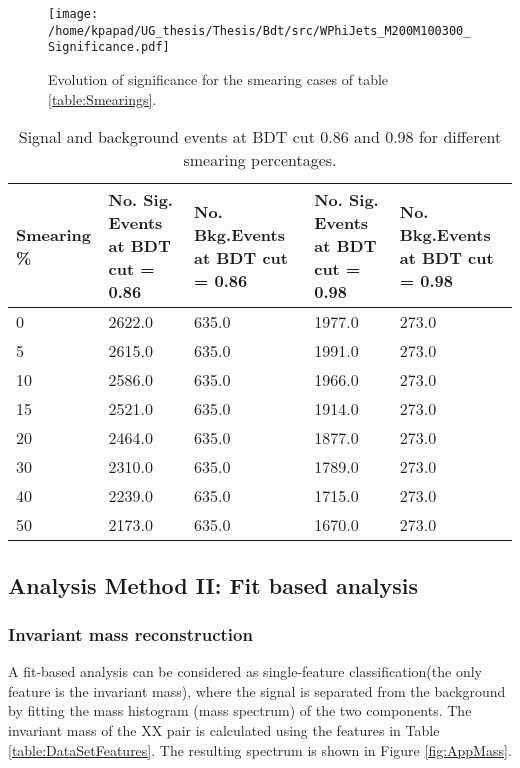 \begin{figure}[h!]
\centering
\texttt{[image: /home/kpapad/UG\_thesis/Thesis/Bdt/src/WPhiJets\_M200M100300\_Significance.pdf]}
\caption{Evolution of significance for the smearing cases of table \ref{table:Smearings}. }
\label{fig:SigEvolBDT}
\end{figure}


\begin{table}[ht]
\centering
\begin{tabular}{|p{2cm}|p{3cm}|p{3cm}|p{3cm}|p{3cm}|}
 \hline
Smearing \%  & No. Sig. Events at BDT cut = 0.86 & No. Bkg.Events at BDT cut = 0.86 & No. Sig. Events at BDT cut = 0.98 & No. Bkg.Events at BDT cut = 0.98  \\
\hline
0 & 2622.0 & 635.0 & 1977.0 & 273.0 \\
5 & 2615.0 & 635.0 & 1991.0  & 273.0 \\
10 & 2586.0 & 635.0 & 1966.0 & 273.0 \\
15 & 2521.0 & 635.0 & 1914.0 & 273.0 \\
20 & 2464.0 & 635.0 & 1877.0 & 273.0 \\
30 & 2310.0 & 635.0 & 1789.0 & 273.0 \\
40 & 2239.0 & 635.0 & 1715.0 & 273.0 \\
50 & 2173.0 & 635.0 & 1670.0 & 273.0 \\
 \hline
\end{tabular}
\caption{Signal and background events at BDT cut 0.86 and 0.98 for different smearing percentages.}
\label{table:SigBkgBDT}
\end{table}

\subsection{Analysis Method II: Fit based analysis}
\label{sec:org82057fb}
\subsubsection{Invariant mass reconstruction}
\label{sec:orge267c60}
A fit-based analysis can be considered as single-feature classification(the only feature is the invariant mass), where the signal is separated from the background by fitting the mass histogram (mass spectrum) of the two components. The invariant mass of the XX pair is calculated using the features in Table \ref{table:DataSetFeatures}. The resulting spectrum is shown in Figure \ref{fig:AppMass}.


